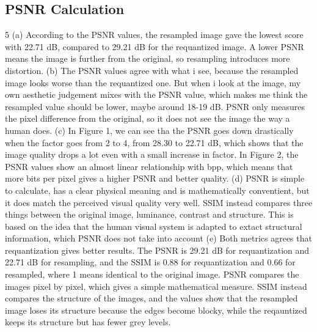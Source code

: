 \documentclass[11pt,a4paper]{article}
\begin{document}
\subsection{PSNR Calculation}
5 (a) According to the PSNR values, the resampled image gave the lowest score with 22.71 dB, compared to 29.21 dB for the requantized image. A lower PSNR means the image is further from the original, so resampling introduces more distortion.
 (b) The PSNR values agree with what i see, because the resampled image looks worse than the requantized one. But when i look at the image, my own aesthetic judgement mixes with the PSNR value, which makes me think the resampled value should be lower, maybe around 18-19 dB. PSNR only measures the pixel difference from the original, so it does not see the image the way a human does.
 (c) In Figure 1, we can see tha the PSNR goes down drastically when the factor goes from 2 to 4, from 28.30 to 22.71 dB, which shows that the image quality drops a lot even with a small increase in factor. In Figure 2, the PSNR values show an almost linear relationship with bpp, which means that more bits per pixel gives a higher PSNR and better quality.
 (d) PSNR is simple to calculate, has a clear physical meaning and is mathematically conventient, but it does match the perceived visual quality very well. SSIM instead compares three things between the original image, luminance, contrast and structure. This is based on the idea that the human visual system is adapted to extact structural information, which PSNR does not take into account \cite{wangImageQualityAssessment2004}
 (e) Both metrics agrees that requantization gives better results. The PSNR is 29.21 dB for requantization and 22.71 dB for resampling, and the SSIM is 0.88 for requantization and 0.66 for resampled, where 1 means identical to the original image. PSNR compares the images pixel by pixel, which gives a simple mathematical measure. SSIM instead compares the structure of the images, and the values show that the resampled image loses its structure because the edges become blocky, while the reqauntized keeps its structure but has fewer grey levels.
\end{document}
